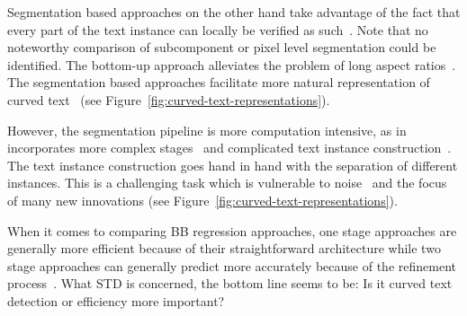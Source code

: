 Segmentation based approaches on the other hand take advantage of the fact that every part of the
text instance can locally be verified as such~\citep{long_scene_2021}.
Note that no noteworthy comparison of subcomponent or pixel level segmentation could be identified.
The bottom-up approach alleviates the problem of long aspect ratios~\citep{shi_detecting_2017}.
The segmentation based approaches facilitate more natural representation of curved
text~\citep{dai_fused_2018,long_scene_2021} (see Figure~\ref{fig:curved-text-representations}).

However, the segmentation pipeline is more computation intensive, as in incorporates more complex
stages~\citep{dai_fused_2018} and complicated text instance
construction~\citep{xie_aggregation_2019,liao_real-time_2019,dai_fused_2018}.
The text instance construction goes hand in hand with the separation of different instances.
This is a challenging task which is vulnerable to noise~\citep{long_scene_2021} and the focus of
many new innovations (see Figure~\ref{fig:curved-text-representations}).

When it comes to comparing \ac{BB} regression approaches, one stage approaches are generally more
efficient  because of their straightforward architecture while two stage approaches can generally
predict more accurately  because of the refinement process~\citep{lu_mimicdet_2020}.
What \ac{STD} is concerned, the bottom line seems to be: Is it curved text detection or efficiency
more important?


